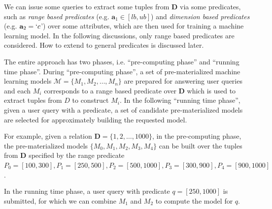 We can issue some queries to extract some tuples from $\textbf{D}$ via some predicates, such as {\em range based predicates} (e.g. $\textbf{a}_1 \in [lb, ub]$) and {\em dimension based predicates} (e.g. $\textbf{a}_2 = `c$') over some attributes, which are then used for training a machine learning model. In the following discussions, only range based predicates are considered. How to extend to general predicates is discussed later. 

The entire approach has two phases, i.e. ``pre-computing phase'' and ``running time phase''. During ``pre-computing phase'', a set of pre-materialized machine learning models $\mathcal{M} = \{M_1, M_2, \dots, M_n\}$ are prepared for answering user queries and each $M_i$ corresponds to a range based predicate over $\textbf{D}$ which is used to extract tuples from $D$ to construct $M_i$. In the following ``running time phase'', given a user query with a predicate, a set of candidate pre-materialized models are selected for approximately building the requested model.

\begin{example}\label{eg: two_phase_eg}
For example, given a relation $\textbf{D}=\{1,2,\dots, 1000\}$, in the pre-computing phase, the pre-materialized models $\{M_0, M_1, M_2, M_3, M_4\}$ can be built over the tuples from $\textbf{D}$ specified by the range predicate $P_0 = [100, 300], P_1 = [250, 500], P_2 = [500, 1000], P_3 = [300, 900], P_4 = [900, 1000]$. 

In the running time phase, a user query with predicate $q=[250, 1000]$ is submitted, for which we can combine $M_1$ and $M_2$ to compute the model for $q$.
\end{example}

